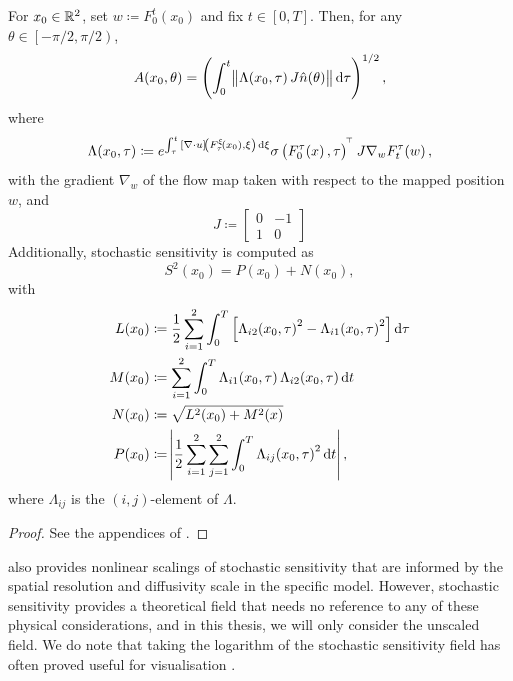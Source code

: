 \begin{theorem}\label{thm:orig_s2_calculation}
	For \(x_0 \in \mathbb{R}^2\), set \(w \coloneqq F_0^t\!\left(x_0\right)\) and fix \(t \in [0,T]\).
	Then, for any \(\theta \in \left[-\pi/2, \pi/2\right)\),
	\[
		A\!\left(x_0,\theta\right) = \left(\int_0^t{\norm{\Lambda\!\left(x_0, \tau\right)J\hat{n}\!\left(\theta\right)}\dif \tau}\right)^{1/2},
	\]
	where
	\[
		\Lambda\!\left(x_0,\tau\right) \coloneqq e^{\int_\tau^t{\left[\nabla \cdot u\right]\!\left(F_\tau^\xi\!\left(x_0\right), \xi\right)\dif\xi}}\sigma\left(F_0^\tau\!\left(x\right), \tau\right)^{\T} J \nabla_w F_t^\tau\!\left(w\right),
	\]
	with the gradient \(\nabla_w\) of the flow map taken with respect to the mapped position \(w\), and
	\[
		J \coloneqq \begin{bmatrix}
			0 & -1 \\
			1 & 0
		\end{bmatrix}
	\]
	Additionally, stochastic sensitivity is computed as
	\[
		S^2\!\left(x_0\right) = P\!\left(x_0\right) + N\!\left(x_0\right),
	\]
	with
	\begin{align*}
		L\!\left(x_0\right) & \coloneqq \frac12\sum_{i=1}^2\int_0^T\left[\Lambda_{i2}\!\left(x_0,\tau\right)^2 - \Lambda_{i1}\!\left(x_0,\tau\right)^2\right]\dif\tau \\
		M\!\left(x_0\right) & \coloneqq \sum_{i=1}^2\int_0^T{\Lambda_{i1}\!\left(x_0,\tau\right)\Lambda_{i2}\!\left(x_0,\tau\right)\dif t}                            \\
		N\!\left(x_0\right) & \coloneqq \sqrt{L^2\!\left(x_0\right) + M^2(x)}                                                                                         \\
		P\!\left(x_0\right) & \coloneqq \abs{\frac12\sum_{i=1}^2\sum_{j=1}^2{\int_0^T{\Lambda_{ij}\!\left(x_0,\tau\right)^2\dif t}}},
	\end{align*}
	where \(\Lambda_{ij}\) is the \((i,j)\)-element of \(\Lambda\).
\end{theorem}
\begin{proof}
	See the appendices of \citet{Balasuriya_2020_StochasticSensitivityComputable}.
\end{proof}

\citet{Balasuriya_2020_StochasticSensitivityComputable} also provides nonlinear scalings of stochastic sensitivity that are informed by the spatial resolution and diffusivity scale in the specific model.
However, stochastic sensitivity provides a theoretical field that needs no reference to any of these physical considerations, and in this thesis, we will only consider the unscaled field.
We do note that taking the logarithm of the stochastic sensitivity field has often proved useful for visualisation \citep[e.g.]{BadzaEtAl_2023_HowSensitiveAre}.

